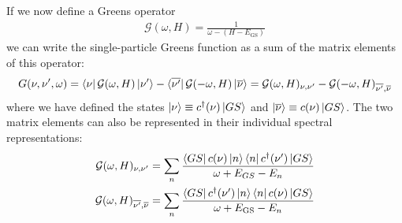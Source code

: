 \documentclass{report}
\numberwithin{equation}{section}
\begin{document}
\begin{appendices}
 If we now define a Greens operator
 \begin{equation}\begin{aligned}
	 \label{inv_G_func}
	 \mathcal{G}(\omega, H) = \frac{1}{\omega - (H - E_\text{GS})}
 \end{aligned}\end{equation}
 we can write the single-particle Greens function as a sum of the matrix elements of this operator:
 \begin{equation}\begin{aligned}
	 \label{G_mat_el}
	 G(\nu, \nu^\prime, \omega) = \bra{\nu} \mathcal{G}(\omega, H) \ket{\nu^\prime} - \bra{\overline{\nu^\prime}} \mathcal{G}(-\omega, H) \ket{\overline\nu} = \mathcal{G}(\omega, H)_{\nu,\nu^\prime} - \mathcal{G}(-\omega, H)_{\overline{\nu^\prime}, \overline\nu}
 \end{aligned}\end{equation}
 where we have defined the states $\ket{\nu} \equiv c^\dagger(\nu)\ket{GS}$ and $\ket{\overline\nu} \equiv c(\nu)\ket{GS}$. The two matrix elements can also be represented in their individual spectral representations:
 \begin{equation}\begin{aligned}
	 \label{G_mat_spec}
 	\mathcal{G}(\omega, H)_{\nu,\nu^\prime} = \sum_{n}\frac{\bra{GS}c(\nu)\ket{n}\bra{n}c^\dagger(\nu^\prime)\ket{GS}}{\omega + E_{GS} - E_n}\\
	\mathcal{G}(\omega, H)_{\overline{\nu^\prime}, \overline\nu} = \sum_{n}\frac{\bra{GS}c^\dagger(\nu^\prime)\ket{n}\bra{n}c(\nu)\ket{GS}}{\omega + E_\text{GS} - E_n}
 \end{aligned}\end{equation}
 

\end{appendices}
\end{document}
